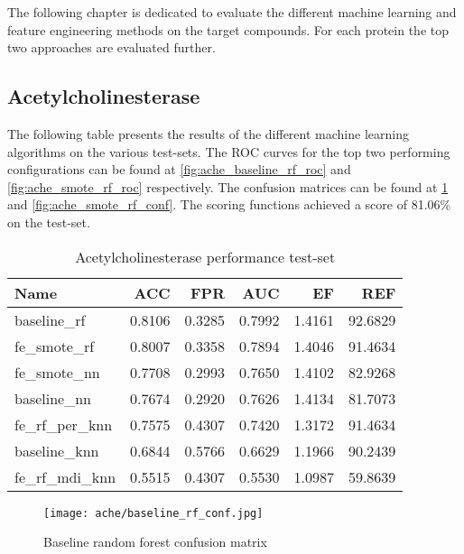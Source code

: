The following chapter is dedicated to evaluate the different machine learning and feature engineering methods on
the target compounds. For each protein the top two approaches are evaluated further.

\subsection{Acetylcholinesterase}
The following table presents the results of the different machine learning algorithms on the various
test-sets. The ROC curves for the top two performing configurations can be found at \ref{fig:ache_baseline_rf_roc} and \ref{fig:ache_smote_rf_roc}
respectively. The confusion matrices can be found at \ref{fig:ache_baseline_rf_conf} and \ref{fig:ache_smote_rf_conf}.
The scoring functions achieved a score of 81.06\% on the test-set. 
\begin{table}[H]
    \begin{center}
        \caption{Acetylcholinesterase performance test-set}
        \begin{tabular}{lrrrrr}
            \toprule
            Name             & ACC    & FPR    & AUC    & EF     & REF     \\
            \midrule
            baseline\_rf     & 0.8106 & 0.3285 & 0.7992 & 1.4161 & 92.6829 \\
            fe\_smote\_rf    & 0.8007 & 0.3358 & 0.7894 & 1.4046 & 91.4634 \\
            fe\_smote\_nn    & 0.7708 & 0.2993 & 0.7650 & 1.4102 & 82.9268 \\
            baseline\_nn     & 0.7674 & 0.2920 & 0.7626 & 1.4134 & 81.7073 \\
            fe\_rf\_per\_knn & 0.7575 & 0.4307 & 0.7420 & 1.3172 & 91.4634 \\
            baseline\_knn    & 0.6844 & 0.5766 & 0.6629 & 1.1966 & 90.2439 \\
            fe\_rf\_mdi\_knn & 0.5515 & 0.4307 & 0.5530 & 1.0987 & 59.8639 \\
            \bottomrule
        \end{tabular}
    \end{center}
\end{table}

\begin{figure}[H]
    \begin{center}
        \caption[]{Baseline random forest confusion matrix}
        \label{fig:ache_baseline_rf_conf}
        \texttt{[image: ache/baseline\_rf\_conf.jpg]}
    \end{center}
\end{figure}

